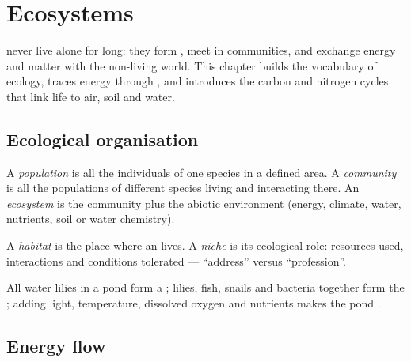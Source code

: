 \chapter{Ecosystems}\label{ch:g10:ecosystems}

 never live alone for long: they form , meet in
communities, and exchange energy and matter with the non-living world.
This chapter builds the vocabulary of ecology, traces energy through , and introduces the carbon and nitrogen cycles that link life to air,
soil and water.

\section{Ecological organisation}

\begin{definition}\label{def:g10:ecosystems:levels}
A \emph{population} is all the individuals of one
species in a defined area. A \emph{community} is all the
populations of different species living and interacting there. An
\emph{ecosystem} is the community plus the abiotic
environment (energy, climate, water, nutrients, soil or water chemistry).
\end{definition}

\begin{definition}\label{def:g10:ecosystems:habitat-niche}
A \emph{habitat} is the place where an  lives. A
\emph{niche} is its ecological role: resources used,
interactions and conditions tolerated --- ``address'' versus
``profession''.
\end{definition}

\begin{example}[Pond]\label{ex:g10:ecosystems:pond}
All water lilies in a pond form a ; lilies, fish, snails and
bacteria together form the ; adding light, temperature, dissolved
oxygen and nutrients makes the pond .
\end{example}

\section{Energy flow}

